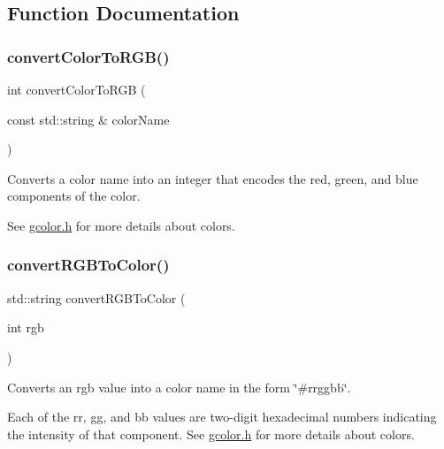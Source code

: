 \subsection{Function Documentation}
\mbox{\label{namespacesgl_aab4a1480d396f913220aea51d117eb94}} 
\subsubsection{\texorpdfstring{convert\+Color\+To\+R\+G\+B()}{convertColorToRGB()}}
{\footnotesize\ttfamily int convert\+Color\+To\+R\+GB (\begin{DoxyParamCaption}\item[{const std\+::string \&}]{color\+Name }\end{DoxyParamCaption})}



Converts a color name into an integer that encodes the red, green, and blue components of the color. 

See \mbox{\hyperlink{gcolor_8h_source}{gcolor.\+h}} for more details about colors. \mbox{\label{namespacesgl_a64353dd79967412aeebe46219e4a71df}} 
\subsubsection{\texorpdfstring{convert\+R\+G\+B\+To\+Color()}{convertRGBToColor()}}
{\footnotesize\ttfamily std\+::string convert\+R\+G\+B\+To\+Color (\begin{DoxyParamCaption}\item[{int}]{rgb }\end{DoxyParamCaption})}



Converts an {\ttfamily rgb} value into a color name in the form {\ttfamily \char`\"{}\#rrggbb\char`\"{}}. 

Each of the {\ttfamily rr}, {\ttfamily gg}, and {\ttfamily bb} values are two-\/digit hexadecimal numbers indicating the intensity of that component. See \mbox{\hyperlink{gcolor_8h_source}{gcolor.\+h}} for more details about colors. \mbox{\label{namespacesgl_aa860978c1abc72823f943acd03b2cb26}} 
